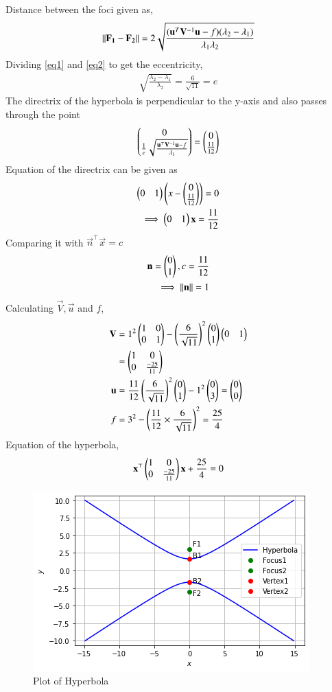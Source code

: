 \documentclass[journal,12pt,twocolumn]{IEEEtran}
\begin{document}
Distance between the foci given as,
\begin{align}
    \label{eq2} \lVert\mathbf{F_1}-\mathbf{F_2}\rVert = 2\sqrt{\frac{(\mathbf{u}^T\mathbf{V}^{-1}\mathbf{u}-f)(\lambda_2-\lambda_1)}{\lambda_1\lambda_2}}
\end{align}
Dividing \eqref{eq1} and \eqref{eq2} to get the eccentricity,
\begin{align}
    \sqrt{\frac{\lambda_2 - \lambda_1}{\lambda_2}} = \frac{6}{\sqrt{11}} = e
\end{align}
The directrix of the hyperbola is perpendicular to the y-axis and also passes through the point 
\begin{align}
    \begin{pmatrix}0\\\frac{1}{e}\sqrt{\frac{\mathbf{u}^{\top}\mathbf{V}^{-1}\mathbf{u} -f}{\lambda_1}}\end{pmatrix} = \begin{pmatrix}0\\\frac{11}{12}\end{pmatrix}
\end{align}
Equation of the directrix can be given as
\begin{align}
    \begin{pmatrix}0&1\end{pmatrix}\left(x - \begin{pmatrix}0\\\frac{11}{12}\end{pmatrix}\right) = 0\\
    \implies \begin{pmatrix}0&1\end{pmatrix}\mathbf{x} = \frac{11}{12}
\end{align}
Comparing it with $\vec{n}^{\top}\vec{x} = c$
\begin{align}
    \mathbf{n} = \begin{pmatrix}0\\1\end{pmatrix}, c = \frac{11}{12}\\
    \implies \lVert\mathbf{n}\rVert = 1
\end{align}
Calculating $\vec{V}, \vec{u}$ and $f$,
\begin{align}
    \mathbf{V} &= 1^2\begin{pmatrix}1&0\\0&1\end{pmatrix} - \left(\frac{6}{\sqrt{11}}\right)^2\begin{pmatrix}0\\1\end{pmatrix}\begin{pmatrix}0&1\end{pmatrix}\\
    &= \begin{pmatrix}1&0\\0&\frac{-25}{11}\end{pmatrix}\\
     \mathbf{u} &= \frac{11}{12}\left(\frac{6}{\sqrt{11}}\right)^2\begin{pmatrix}0\\1\end{pmatrix} - 1^2\begin{pmatrix}0\\3\end{pmatrix}=\begin{pmatrix}0\\0\end{pmatrix}\\
    f &= 3^2 - \left(\frac{11}{12}\times\frac{6}{\sqrt{11}}\right)^2 = \frac{25}{4}
\end{align}
Equation of the hyperbola,
\begin{align}
    \mathbf{x}^{\top}\begin{pmatrix}1&0\\0&\frac{-25}{11}\end{pmatrix}\mathbf{x}+\frac{25}{4}=0
\end{align}
\begin{figure}[h!]
\centering
\includegraphics[width=\columnwidth]{hyperbola_plot.png}
\caption{Plot of Hyperbola}
\label{fig:hyperbola}
\end{figure}
\end{document}
